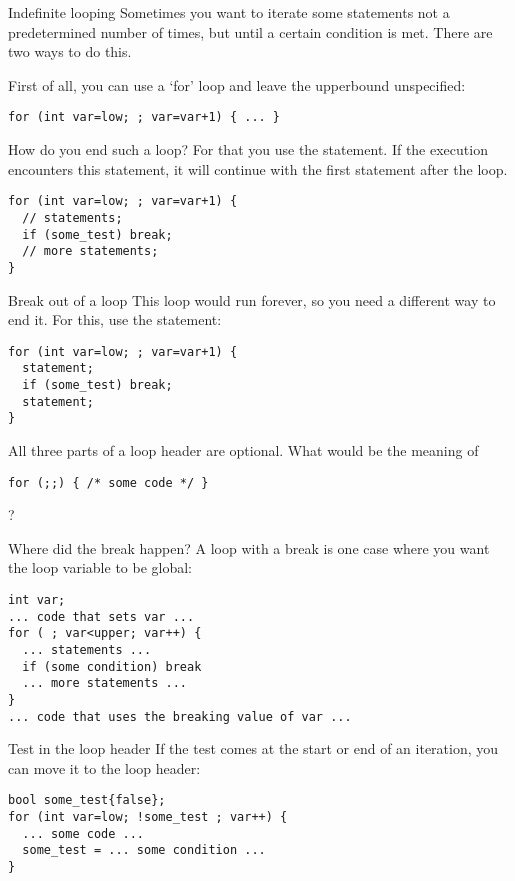 \begin{slide}{Indefinite looping}
  \label{sl:for-inf}
  Sometimes you want to iterate some statements not a predetermined
  number of times, but until a certain condition is met. There are two
  ways to do this.

  First of all, you can use a `for' loop and leave the upperbound
  unspecified:
\begin{lstlisting}
for (int var=low; ; var=var+1) { ... }
\end{lstlisting}
\end{slide}

How do you end such a loop? For that you use the
 statement. If the execution encounters this
statement, it will continue with the first statement after the loop.

\begin{lstlisting}
for (int var=low; ; var=var+1) {
  // statements;
  if (some_test) break;
  // more statements;
}
\end{lstlisting}

\begin{slide}{Break out of a loop}
  \label{sl:for-break}
  This loop would run forever, so you need a different way to end
  it. For this, use the  statement:
\begin{lstlisting}
for (int var=low; ; var=var+1) {
  statement;
  if (some_test) break;
  statement;
}
\end{lstlisting}
\end{slide}

\begin{exercise}
  All three parts of a loop header are optional. What would be the
  meaning of
\begin{lstlisting}
for (;;) { /* some code */ }
\end{lstlisting}
?
\end{exercise}

\begin{block}{Where did the break happen?}
  \label{sl:for-break-var}
  A loop with a break is one case where you want the loop variable to
  be global:
\begin{lstlisting}
int var;
... code that sets var ...
for ( ; var<upper; var++) {
  ... statements ...
  if (some condition) break
  ... more statements ...
}
... code that uses the breaking value of var ...
\end{lstlisting}
\end{block}

\begin{block}{Test in the loop header}
  \label{sl:looptest}
  If the test comes at the start or end of an iteration, you can move it
  to the loop header:
\begin{lstlisting}
bool some_test{false};
for (int var=low; !some_test ; var++) {
  ... some code ...
  some_test = ... some condition ...
}
\end{lstlisting}
\end{block}

